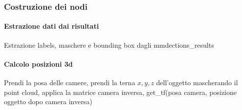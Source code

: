 \subsubsection{Costruzione dei nodi}
\paragraph{Estrazione dati dai risultati}
Estrazione labels, maschere e bounding box dagli mmdections\_results
\paragraph{Calcolo posizioni 3d}
Prendi la posa delle camere, prendi la terna $x,y,z$ dell'oggetto mascherando il point cloud, applica la matrice camera inversa, get\_tf(posa camera, posizione oggetto dopo camera inversa)


